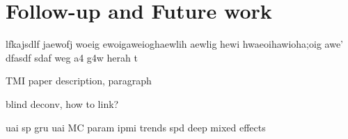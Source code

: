 \chapter{Follow-up and Future work}
lfkajsdlf jaewofj woeig ewoigaweioghaewlih aewlig hewi hwaeoihawioha;oig awe' dfasdf sdaf weg a4 g4w herah t


TMI paper description, paragraph

blind deconv, how to link?

uai sp gru
uai MC param
ipmi trends spd deep mixed effects

